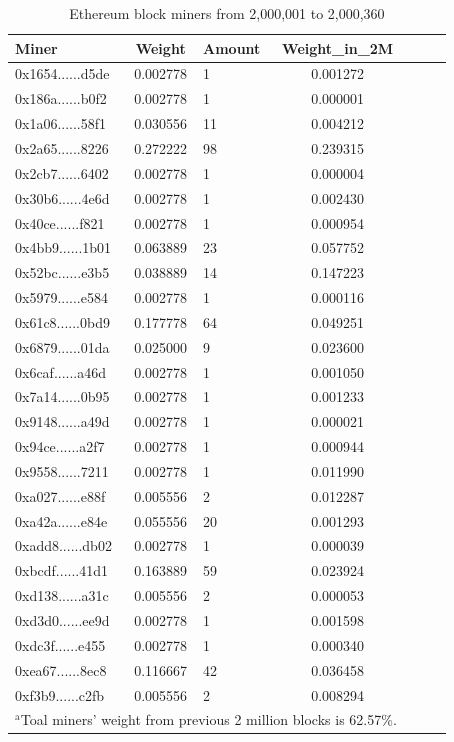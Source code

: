 \documentclass[conference]{IEEEtran}
\begin{document}
\begin{table}[htbp]
\caption{Ethereum block miners from 2,000,001 to 2,000,360}
\begin{center}
\begin{tabular}{lclclcl}
\hline
Miner                                      & Weight   & Amount & Weight\_in\_2M \\
\hline
0x1654......d5de & 0.002778 & 1      & 0.001272       \\
0x186a......b0f2 & 0.002778 & 1      & 0.000001       \\
0x1a06......58f1 & 0.030556 & 11     & 0.004212       \\
0x2a65......8226 & 0.272222 & 98     & 0.239315       \\
0x2cb7......6402 & 0.002778 & 1      & 0.000004       \\
0x30b6......4e6d & 0.002778 & 1      & 0.002430       \\
0x40ce......f821 & 0.002778 & 1      & 0.000954       \\
0x4bb9......1b01 & 0.063889 & 23     & 0.057752       \\
0x52bc......e3b5 & 0.038889 & 14     & 0.147223       \\
0x5979......e584 & 0.002778 & 1      & 0.000116       \\
0x61c8......0bd9 & 0.177778 & 64     & 0.049251       \\
0x6879......01da & 0.025000 & 9      & 0.023600       \\
0x6caf......a46d & 0.002778 & 1      & 0.001050       \\
0x7a14......0b95 & 0.002778 & 1      & 0.001233       \\
0x9148......a49d & 0.002778 & 1      & 0.000021       \\
0x94ce......a2f7 & 0.002778 & 1      & 0.000944       \\
0x9558......7211 & 0.002778 & 1      & 0.011990       \\
0xa027......e88f & 0.005556 & 2      & 0.012287       \\
0xa42a......e84e & 0.055556 & 20     & 0.001293       \\
0xadd8......db02 & 0.002778 & 1      & 0.000039       \\
0xbcdf......41d1 & 0.163889 & 59     & 0.023924       \\
0xd138......a31c & 0.005556 & 2      & 0.000053       \\
0xd3d0......ee9d & 0.002778 & 1      & 0.001598       \\
0xdc3f......e455 & 0.002778 & 1      & 0.000340       \\
0xea67......8ec8 & 0.116667 & 42     & 0.036458       \\
0xf3b9......c2fb & 0.005556 & 2      & 0.008294      \\
\hline
\multicolumn{4}{l}{$^{\mathrm{a}}$Toal miners' weight from previous 2 million blocks is 62.57\%.}
\end{tabular}
\end{center}
\end{table}
\end{document}
